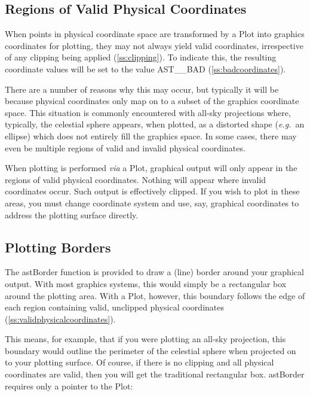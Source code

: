 \documentclass[twoside,11pt]{article}
\newcommand{\htmlref}[2]{#1}
\newcommand{\secref}[1]{\S\ref{#1}}
\renewcommand{\secref}[1]{\ref{#1}}
\begin{document}
\subsection{\label{ss:validphysicalcoordinates}Regions of Valid Physical Coordinates}

When points in physical coordinate space are transformed by a \htmlref{Plot}{Plot}
into graphics coordinates for plotting, they may not always yield
valid coordinates, irrespective of any clipping being applied
(\secref{ss:clipping}). To indicate this, the resulting coordinate
values will be set to the value AST\_\_BAD
(\secref{ss:badcoordinates}).

There are a number of reasons why this may occur, but typically it
will be because physical coordinates only map on to a subset of the
graphics coordinate space. This situation is commonly encountered with
all-sky projections where, typically, the celestial sphere appears,
when plotted, as a distorted shape ({\em{e.g.}}\ an ellipse) which
does not entirely fill the graphics space. In some cases, there may
even be multiple regions of valid and invalid physical coordinates.

When plotting is performed {\em{via}} a Plot, graphical output will
only appear in the regions of valid physical coordinates. Nothing will
appear where invalid coordinates occur. Such output is effectively
clipped. If you wish to plot in these areas, you must change
coordinate system and use, say, graphical coordinates to address the
plotting surface directly.

\subsection{Plotting Borders}

The \htmlref{astBorder}{astBorder} function is provided to draw a (line) border around your
graphical output. With most graphics systems, this would simply be a
rectangular box around the plotting area. With a \htmlref{Plot}{Plot}, however, this
boundary follows the edge of each region containing valid, unclipped
physical coordinates (\secref{ss:validphysicalcoordinates}).

This means, for example, that if you were plotting an all-sky
projection, this boundary would outline the perimeter of the celestial
sphere when projected on to your plotting surface. Of course, if there
is no clipping and all physical coordinates are valid, then you will
get the traditional rectangular box. astBorder requires only
a pointer to the Plot:
\end{document}
